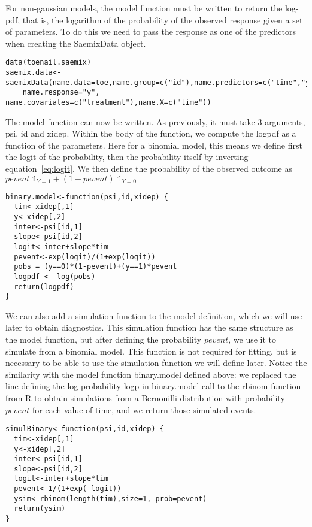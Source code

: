 For non-gaussian models, the model function must be written to return the log-pdf, that is, the logarithm of the probability of the observed response given a set of parameters. To do this we need to pass the response as one of the predictors when creating the {\sf SaemixData} object.
\begin{verbatim}
data(toenail.saemix)
saemix.data<-saemixData(name.data=toe,name.group=c("id"),name.predictors=c("time","y"), 
    name.response="y", name.covariates=c("treatment"),name.X=c("time"))
\end{verbatim}

The model function can now be written. As previously, it must take 3 arguments, {\sf psi}, {\sf id} and {\sf xidep}. Within the body of the function, we compute the logpdf as a function of the parameters. Here for a binomial model, this means we define first the logit of the probability, then the probability itself by inverting equation~\ref{eq:logit}. We then define the probability of the observed outcome as $pevent \; \mathbb{1}_{Y=1} + (1-pevent) \; \mathbb{1}_{Y=0}$
\begin{verbatim}
binary.model<-function(psi,id,xidep) {
  tim<-xidep[,1]
  y<-xidep[,2]
  inter<-psi[id,1]
  slope<-psi[id,2]
  logit<-inter+slope*tim
  pevent<-exp(logit)/(1+exp(logit))
  pobs = (y==0)*(1-pevent)+(y==1)*pevent
  logpdf <- log(pobs)
  return(logpdf)
}
\end{verbatim}

We can also add a simulation function to the model definition, which we will use later to obtain diagnostics. This simulation function has the same structure as the model function, but after defining the probability $pevent$, we use it to simulate from a binomial model. This function is not required for fitting, but is necessary to be able to use the simulation function we will define later. Notice the similarity with the model function {\sf binary.model} defined above: we replaced the line defining the log-probability {\sf logp} in {\sf binary.model}  call to the {\sf rbinom} function from {\sf R} to obtain simulations from a Bernouilli distribution with probability $pevent$ for each value of time, and we return those simulated events.
\begin{verbatim}
simulBinary<-function(psi,id,xidep) {
  tim<-xidep[,1]
  y<-xidep[,2]
  inter<-psi[id,1]
  slope<-psi[id,2]
  logit<-inter+slope*tim
  pevent<-1/(1+exp(-logit))
  ysim<-rbinom(length(tim),size=1, prob=pevent)
  return(ysim)
}
\end{verbatim}

